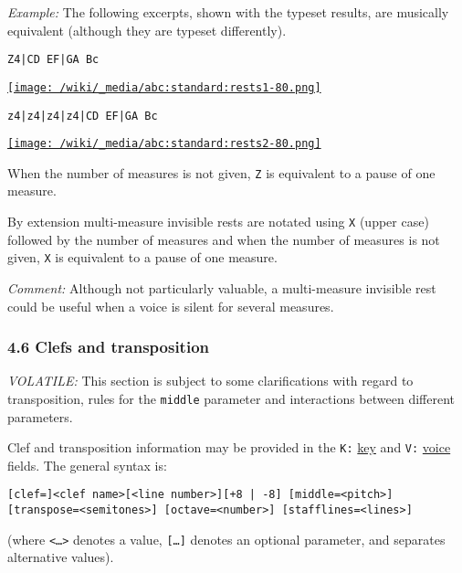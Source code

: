 \emph{Example:} The following excerpts, shown with the typeset results,
are musically equivalent (although they are typeset differently).

\begin{verbatim}
Z4|CD EF|GA Bc
\end{verbatim}

\href{/wiki/_detail/abc:standard:rests1-80.png?id=abc\%3Astandard\%3Av2.1}{\texttt{[image: /wiki/\_media/abc:standard:rests1-80.png]}}

\begin{verbatim}
z4|z4|z4|z4|CD EF|GA Bc
\end{verbatim}

\href{/wiki/_detail/abc:standard:rests2-80.png?id=abc\%3Astandard\%3Av2.1}{\texttt{[image: /wiki/\_media/abc:standard:rests2-80.png]}}

When the number of measures is not given, \texttt{Z} is equivalent to a
pause of one measure.

By extension multi-measure invisible rests are notated using \texttt{X}
(upper case) followed by the number of measures and when the number of
measures is not given, \texttt{X} is equivalent to a pause of one
measure.

\emph{Comment:} Although not particularly valuable, a multi-measure
invisible rest could be useful when a voice is silent for several
measures.

\hypertarget{clefs_and_transposition}{\subsubsection{4.6 Clefs and
transposition}\label{clefs_and_transposition}}

\emph{VOLATILE:} This section is subject to some clarifications with
regard to transposition, rules for the \texttt{middle} parameter and
interactions between different parameters.

Clef and transposition information may be provided in the \texttt{K:}
\protect\hyperlink{kkey}{key} and \texttt{V:}
\protect\hyperlink{multiple_voices}{voice} fields. The general syntax
is:

\begin{verbatim}
[clef=]<clef name>[<line number>][+8 | -8] [middle=<pitch>] [transpose=<semitones>] [octave=<number>] [stafflines=<lines>]
\end{verbatim}

(where \texttt{\textless{}\ldots{}\textgreater{}} denotes a value,
\texttt{{[}\ldots{}{]}} denotes an optional parameter, and
\texttt{\textbar{}} separates alternative values).

